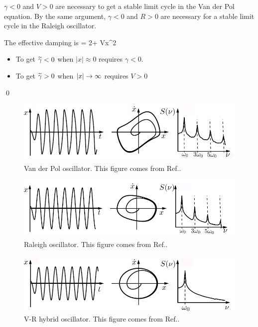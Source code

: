 \begin{claim}
 $\gamma<0$ and $V>0$ are necessary to get a 
 stable limit cycle
 in the Van der Pol equation.
 By the same argument, $\gamma<0$ and $R>0$ are necessary
 for a stable limit cycle in the Raleigh oscillator.
 \end{claim} 
 \proof
 
The effective damping is
\TIL{\gamma}= 2\gamma + Vx^2
\eeq
\begin{itemize}
\item
To get ${\widetilde{\gamma}}<0$   when $|x|\approx 0$ requires $\gamma<0$. 
\item 
To get ${\widetilde{\gamma}}>0$ when $|x|\rightarrow \infty$
requires $V>0$
\end{itemize}
\qed



\begin{figure}[h!]
\centering
\includegraphics[width=5in]
{dynamical-sys/van-der-pol-term.png}
\caption{Van der Pol oscillator. This
 figure  comes from Ref.\cite{dynamical-fuchs}.}
\label{fig-van-der-pol-term}
\end{figure}

\begin{figure}[h!]
\centering
\includegraphics[width=5in]
{dynamical-sys/raleigh-term.png}
\caption{Raleigh oscillator. This
 figure  comes from Ref.\cite{dynamical-fuchs}.}
\label{fig-raleigh-term}
\end{figure}

\begin{figure}[h!]
\centering
\includegraphics[width=5in]
{dynamical-sys/hybrid-term.png}
\caption{V-R hybrid oscillator. This
 figure  comes from Ref.\cite{dynamical-fuchs}.}
\label{fig-hybrid-term}
\end{figure}


